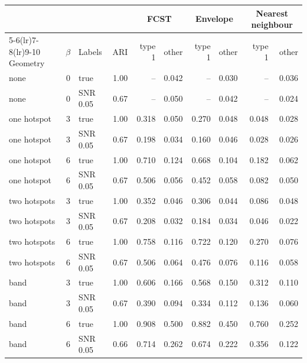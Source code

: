\begin{tabular}{@{}lrlrrrrrrr@{}}
\toprule
 & & & & \multicolumn{2}{c}{FCST} & \multicolumn{2}{c}{Envelope} & \multicolumn{2}{c}{Nearest neighbour} \\
\cmidrule(lr){5-6}\cmidrule(lr){7-8}\cmidrule(lr){9-10}
Geometry & $\beta$ & Labels & ARI & type 1 & other & type 1 & other & type 1 & other \\
\midrule
none & 0 & true & 1.00 & -- & 0.042 & -- & 0.030 & -- & 0.036 \\
none & 0 & SNR 0.05 & 0.67 & -- & 0.050 & -- & 0.042 & -- & 0.024 \\
one hotspot & 3 & true & 1.00 & 0.318 & 0.050 & 0.270 & 0.048 & 0.048 & 0.028 \\
one hotspot & 3 & SNR 0.05 & 0.67 & 0.198 & 0.034 & 0.160 & 0.046 & 0.028 & 0.026 \\
one hotspot & 6 & true & 1.00 & 0.710 & 0.124 & 0.668 & 0.104 & 0.182 & 0.062 \\
one hotspot & 6 & SNR 0.05 & 0.67 & 0.506 & 0.056 & 0.452 & 0.058 & 0.082 & 0.050 \\
two hotspots & 3 & true & 1.00 & 0.352 & 0.046 & 0.306 & 0.044 & 0.086 & 0.048 \\
two hotspots & 3 & SNR 0.05 & 0.67 & 0.208 & 0.032 & 0.184 & 0.034 & 0.046 & 0.022 \\
two hotspots & 6 & true & 1.00 & 0.758 & 0.116 & 0.722 & 0.120 & 0.270 & 0.076 \\
two hotspots & 6 & SNR 0.05 & 0.67 & 0.506 & 0.064 & 0.476 & 0.076 & 0.116 & 0.058 \\
band & 3 & true & 1.00 & 0.606 & 0.166 & 0.568 & 0.150 & 0.312 & 0.110 \\
band & 3 & SNR 0.05 & 0.67 & 0.390 & 0.094 & 0.334 & 0.112 & 0.136 & 0.060 \\
band & 6 & true & 1.00 & 0.908 & 0.500 & 0.882 & 0.450 & 0.760 & 0.252 \\
band & 6 & SNR 0.05 & 0.66 & 0.714 & 0.262 & 0.674 & 0.222 & 0.356 & 0.122 \\
\bottomrule
\end{tabular}
